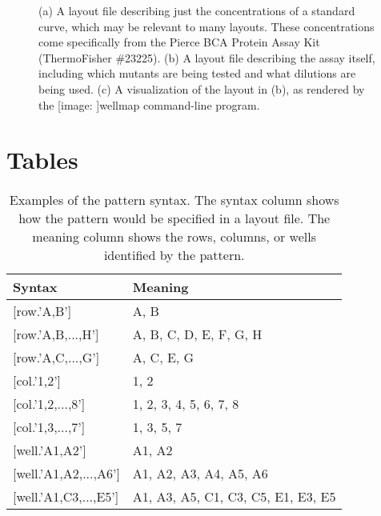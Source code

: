 \documentclass{bmcart}
\def\texttt{[image: ]}
\begin{document}
\begin{backmatter}
\begin{figure}[h!]
  \caption{\label{fig:bradford}%
     (a)
    A layout file describing just the concentrations of a standard curve, which
    may be relevant to many layouts. These concentrations come specifically
    from the Pierce BCA Protein Assay Kit (ThermoFisher \#23225). (b) A layout
    file describing the assay itself, including which mutants are being tested
    and what dilutions are being used.  (c) A visualization of the layout in
    (b), as rendered by the \texttt{wellmap} command-line program.}
\end{figure}


\section*{Tables}

\begin{table}[h!]

  \caption{\label{tab:pattern-syntax}
    Examples of the pattern syntax. The syntax column shows how the pattern
    would be specified in a layout file.  The meaning column shows the rows,
    columns, or wells identified by the pattern.}

  \begin{tabular}{ll}
  \toprule 
  Syntax & Meaning\\
  \midrule 
  {[}row.'A,B'{]} & A, B\\
  {[}row.'A,B,...,H'{]} & A, B, C, D, E, F, G, H\\
  {[}row.'A,C,...,G'{]} & A, C, E, G\\
  \midrule 
  {[}col.'1,2'{]} & 1, 2\\
  {[}col.'1,2,...,8'{]} & 1, 2, 3, 4, 5, 6, 7, 8\\
  {[}col.'1,3,...,7'{]} & 1, 3, 5, 7\\
  \midrule 
  {[}well.'A1,A2'{]} & A1, A2\\
  {[}well.'A1,A2,...,A6'{]} & A1, A2, A3, A4, A5, A6\\
  {[}well.'A1,C3,...,E5'{]} & A1, A3, A5, C1, C3, C5, E1, E3, E5\\
  \bottomrule
  \end{tabular}

\end{table}

\end{backmatter}
\end{document}
